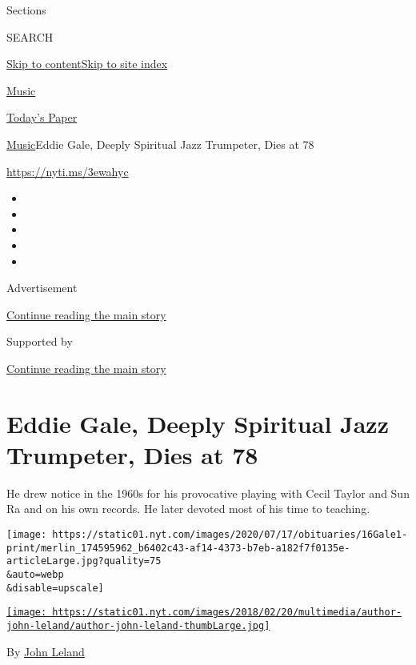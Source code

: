 Sections

SEARCH

\protect\hyperlink{site-content}{Skip to
content}\protect\hyperlink{site-index}{Skip to site index}

\href{https://www.nytimes.com/section/arts/music}{Music}

\href{https://myaccount.nytimes.com/auth/login?response_type=cookie\&client_id=vi}{}

\href{https://www.nytimes.com/section/todayspaper}{Today's Paper}

\href{/section/arts/music}{Music}\textbar{}Eddie Gale, Deeply Spiritual
Jazz Trumpeter, Dies at 78

\url{https://nyti.ms/3ewahyc}

\begin{itemize}
\item
\item
\item
\item
\item
\end{itemize}

Advertisement

\protect\hyperlink{after-top}{Continue reading the main story}

Supported by

\protect\hyperlink{after-sponsor}{Continue reading the main story}

\hypertarget{eddie-gale-deeply-spiritual-jazz-trumpeter-dies-at-78}{%
\section{Eddie Gale, Deeply Spiritual Jazz Trumpeter, Dies at
78}\label{eddie-gale-deeply-spiritual-jazz-trumpeter-dies-at-78}}

He drew notice in the 1960s for his provocative playing with Cecil
Taylor and Sun Ra and on his own records. He later devoted most of his
time to teaching.

\texttt{[image: https://static01.nyt.com/images/2020/07/17/obituaries/16Gale1-print/merlin\_174595962\_b6402c43-af14-4373-b7eb-a182f7f0135e-articleLarge.jpg?quality=75\\\&auto=webp\\\&disable=upscale]}

\href{https://www.nytimes.com/by/john-leland}{\texttt{[image: https://static01.nyt.com/images/2018/02/20/multimedia/author-john-leland/author-john-leland-thumbLarge.jpg]}}

By \href{https://www.nytimes.com/by/john-leland}{John Leland}

